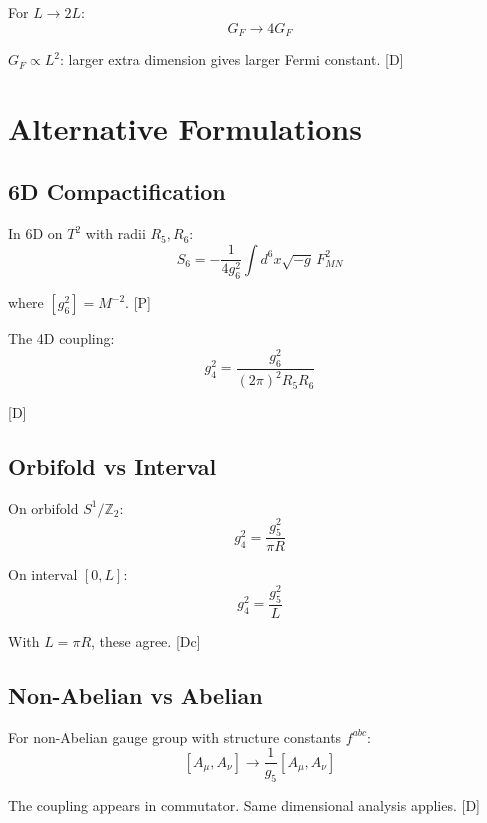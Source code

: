 \documentclass[11pt,a4paper]{article}
\newcommand{\tagD}{\textcolor{blue!70!black}{[D]}}
\newcommand{\tagDc}{\textcolor{blue!50!black}{[Dc]}}
\newcommand{\tagP}{\textcolor{green!50!black}{[P]}}
\begin{document}
For $L \to 2L$:
\begin{equation}
\label{eq:app-scale-test}
G_F \to 4 G_F
\end{equation}

$G_F \propto L^2$: larger extra dimension gives larger Fermi constant. \tagD

\section{Alternative Formulations}
\label{app:alt}

\subsection{6D Compactification}

In 6D on $T^2$ with radii $R_5, R_6$:
\begin{equation}
\label{eq:app-6d-action}
S_6 = -\frac{1}{4g_6^2} \int d^6x \sqrt{-g}\, F_{MN}^2
\end{equation}

where $[g_6^2] = M^{-2}$. \tagP

The 4D coupling:
\begin{equation}
\label{eq:app-g4-6d}
g_4^2 = \frac{g_6^2}{(2\pi)^2 R_5 R_6}
\end{equation}

\tagD

\subsection{Orbifold vs Interval}

On orbifold $S^1/\mathbb{Z}_2$:
\begin{equation}
\label{eq:app-orbifold}
g_4^2 = \frac{g_5^2}{\pi R}
\end{equation}

On interval $[0, L]$:
\begin{equation}
\label{eq:app-interval}
g_4^2 = \frac{g_5^2}{L}
\end{equation}

With $L = \pi R$, these agree. \tagDc

\subsection{Non-Abelian vs Abelian}

For non-Abelian gauge group with structure constants $f^{abc}$:
\begin{equation}
\label{eq:app-nonab}
[A_\mu, A_\nu] \to \frac{1}{g_5} [A_\mu, A_\nu]
\end{equation}

The coupling appears in commutator. Same dimensional analysis applies. \tagD

\end{document}
